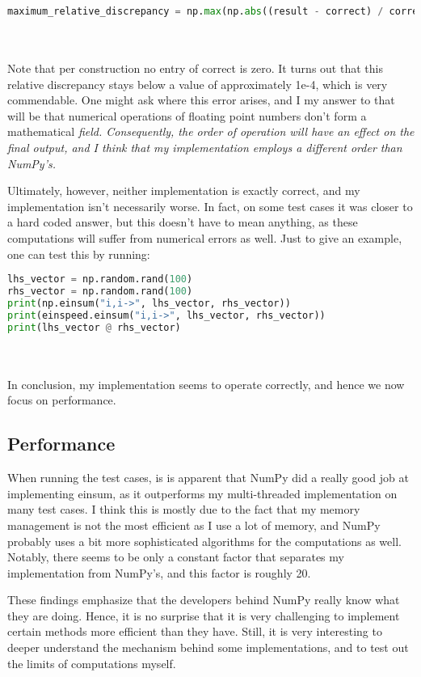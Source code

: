\documentclass[sigconf]{acmart}
\renewcommand{\texttt}[1]{\begingroup\ttfamily\sloppy\hbadness=10000 #1\endgroup}
\begin{document}
\begin{lstlisting}[language=Python]
maximum_relative_discrepancy = np.max(np.abs((result - correct) / correct))
\end{lstlisting}
\\\\
Note that per construction no entry of \texttt{correct} is zero.
It turns out that this relative discrepancy stays below a value of approximately \texttt{1e-4}, which is very commendable. One might ask where this error arises, and I my answer to that will be that numerical operations of floating point numbers don't form a mathematical \em field\em . Consequently, the order of operation will have an effect on the final output, and I think that my implementation employs a different order than NumPy's.

Ultimately, however, neither implementation is exactly correct, and my implementation isn't necessarily worse. In fact, on some test cases it was closer to a hard coded answer, but this doesn't have to mean anything, as these computations will suffer from numerical errors as well. Just to give an example, one can test this by running:

\begin{lstlisting}[language=Python]
lhs_vector = np.random.rand(100)
rhs_vector = np.random.rand(100)
print(np.einsum("i,i->", lhs_vector, rhs_vector))
print(einspeed.einsum("i,i->", lhs_vector, rhs_vector))
print(lhs_vector @ rhs_vector)
\end{lstlisting}
\\\\
In conclusion, my implementation seems to operate correctly, and hence we now focus on performance.


\subsection{Performance}
When running the test cases, is is apparent that NumPy did a really good job at implementing einsum, as it outperforms my multi-threaded implementation on many test cases. I think this is mostly due to the fact that my memory management is not the most efficient as I use a lot of memory, and NumPy probably uses a bit more sophisticated algorithms for the computations as well. Notably, there seems to be only a constant factor that separates my implementation from NumPy's, and this factor is roughly 20.

These findings emphasize that the developers behind NumPy really know what they are doing. Hence, it is no surprise that it is very challenging to implement certain methods more efficient than they have. Still, it is very interesting to deeper understand the mechanism behind some implementations, and to test out the limits of computations myself.
\end{document}
